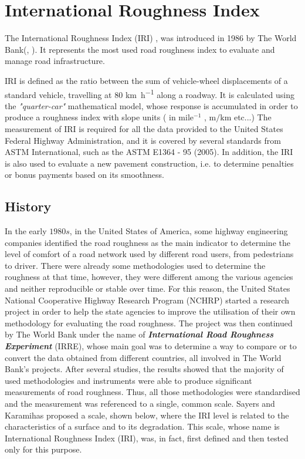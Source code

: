 \documentclass[tesi]{subfiles}
\begin{document}
	\chapter{International Roughness Index}
\label{ch:IRI}
The International Roughness Index (IRI) \cite{sayers1986guidelines}, was introduced in 1986 by The World Bank(\cite{sayers1986guidelines}, \cite{sayers1986international}). It represents the most used road roughness index to evaluate and manage road infrastructure. 


IRI is defined as the ratio between the sum of vehicle-wheel displacements of a standard vehicle, travelling at \num{80} \si{\km\per\hour} along a roadway\cite{sayers1995calculation}. It is calculated using the \textit{"quarter-car"} mathematical model, whose response is accumulated in order to produce a roughness index\cite{little_book} with slope units ( in  mile$^{-1}$ , $\si{\meter\per\km}$  etc...) 
The measurement of IRI is required for all the data provided to the United States Federal Highway Administration, and it is covered by several standards from ASTM International, such as the ASTM E1364 - 95 (2005)\cite{astm2}. In addition, the IRI is also used to evaluate a new pavement construction, i.e. to determine penalties or bonus payments based on its smoothness.

\section{History}\label{sc:IRI_History}
In the early $1980s$, in the United States of America, some highway engineering companies identified the road roughness as the main indicator to determine the level of comfort of a road network used by different road users, from pedestrians to driver. 
There were already some methodologies used to determine the roughness at that time, however, they were different among the various agencies and neither reproducible or stable over time. 
For this reason, the United States National Cooperative Highway Research Program (NCHRP) started a research project in order to help the state agencies to improve the utilisation of their own methodology for evaluating the road roughness\cite{gillespie1980calibration}. The project was then continued by The World Bank\cite{sayers1986guidelines} under the name of \textbf{\textit{International Road Roughness Experiment}} (IRRE)\cite{sayers1986internationalscale}, whose main goal was to determine a way to compare or to convert the data obtained from different countries, all involved in The World Bank's projects.
After several studies, the results showed that the majority of used methodologies and instruments were able to produce significant measurements\cite{sayers1986international} of road roughness. Thus, all those methodologies were standardised and the measurement was referenced to a single, common scale.
Sayers and Karamihas\cite{little_book} proposed a scale, shown below, where the IRI level is related to the characteristics of a surface and to its degradation. This scale, whose name is International Roughness Index (IRI), was, in fact, first defined and then tested only for this purpose.
\end{document}
